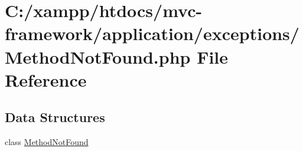 \hypertarget{_method_not_found_8php}{}\section{C\+:/xampp/htdocs/mvc-\/framework/application/exceptions/\+Method\+Not\+Found.php File Reference}
\label{_method_not_found_8php}
\subsection*{Data Structures}
\begin{DoxyCompactItemize}
\item 
class \hyperlink{class_method_not_found}{Method\+Not\+Found}
\end{DoxyCompactItemize}
